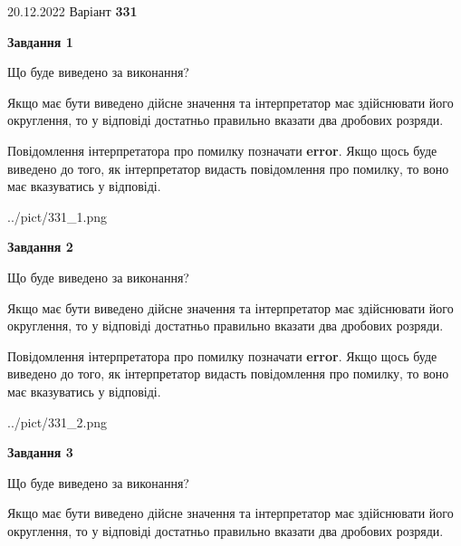 \documentclass[12pt, ukrainian]{article}
\begin{document}
{20.12.2022 Варіант \No \textbf { 331 }\par}
{
\begin {Large}

{\begin {center}\textbf{Завдання 1}\end {center}}\par
Що буде виведено за виконання? \par

Якщо має бути виведено дійсне значення та інтерпретатор має здійснювати його округлення, 
то у відповіді достатньо правильно вказати два дробових розряди.

Повідомлення інтерпретатора про помилку позначати \textbf{error}.
Якщо щось буде виведено до того, як інтерпретатор видасть повідомлення про помилку, 
то воно має вказуватись у відповіді. \par

\begin{center}
	{../pict/331_1.png}
\end{center}
\newpage

{\begin {center}\textbf{Завдання 2}\end {center}}\par
Що буде виведено за виконання? \par

Якщо має бути виведено дійсне значення та інтерпретатор має здійснювати його округлення, 
то у відповіді достатньо правильно вказати два дробових розряди.

Повідомлення інтерпретатора про помилку позначати \textbf{error}.
Якщо щось буде виведено до того, як інтерпретатор видасть повідомлення про помилку, 
то воно має вказуватись у відповіді. \par

\begin{center}
	{../pict/331_2.png}
\end{center}
\newpage

{\begin {center}\textbf{Завдання 3}\end {center}}\par
Що буде виведено за виконання? \par

Якщо має бути виведено дійсне значення та інтерпретатор має здійснювати його округлення, 
то у відповіді достатньо правильно вказати два дробових розряди.


\end{Large}}
\end{document}
